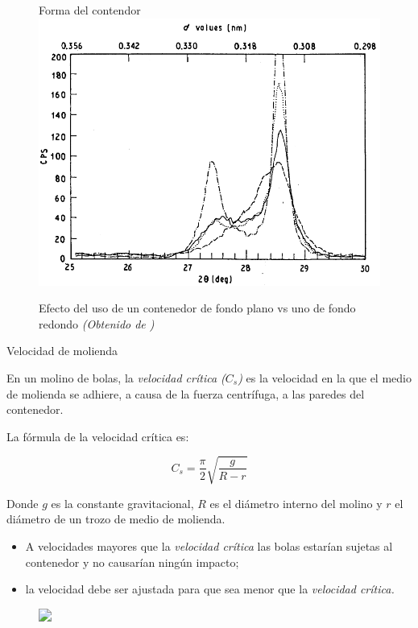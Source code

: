 \documentclass[%
spanish,
    progressbar=head,
background=dark,
subsectionpage
]{beamer}
\begin{document}
\begin{frame}
    \begin{figure}{Forma del contendor}
        \centering
        \includegraphics[width=0.85\linewidth]{figuras/efectoXRD.png}
        \caption{Efecto del uso de un contenedor de fondo plano vs uno de fondo redondo \textit{(Obtenido de \cite{harringa1992effects})}}
    \end{figure}
\end{frame}

\begin{frame}{Velocidad de molienda}
    \begin{tcolorbox}[title={Velocidad crítica, \(C_s\):}]
        \small
        En un molino de bolas, la \emph{velocidad crítica (\(C_s\))} es la velocidad en la que el medio de molienda se adhiere, a causa de la fuerza centrífuga, a las paredes del contenedor.
        
        La fórmula de la velocidad crítica es:

        \begin{equation}
            C_s = \frac{\pi}{2}\sqrt{\frac{g}{R-r}}
        \end{equation}

        Donde \(g\) es la constante gravitacional, \(R\) es el diámetro interno del molino y \(r\) el diámetro de un trozo de medio de molienda. 
    \end{tcolorbox}
\end{frame}

\begin{frame}
    \begin{itemize}
        \item<1-> A velocidades mayores que la \textit{velocidad crítica} las bolas estarían sujetas al contenedor y no causarían ningún impacto;
        \item<2-> la velocidad debe ser ajustada para que sea menor que la \emph{velocidad crítica.} 
    \end{itemize}

    \begin{figure}
        \centering
        \includegraphics<1->[width=0.9\linewidth]{figuras/Cs/vel1.jpeg}
    \end{figure}
\end{frame}
\end{document}
